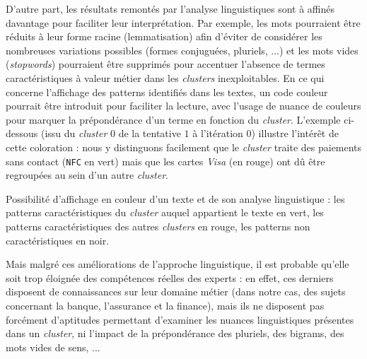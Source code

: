 			D'autre part, les résultats remontés par l'analyse linguistiques sont à affinés davantage pour faciliter leur interprétation.
			Par exemple, les mots pourraient être réduits à leur forme racine (lemmatisation) afin d'éviter de considérer les nombreuses variations possibles (formes conjuguées, pluriels, ...) et les mots vides (\textit{stopwords}) pourraient être supprimés pour accentuer l'absence de termes caractéristiques à valeur métier dans les \textit{clusters} inexploitables.
			En ce qui concerne l'affichage des patterns identifiés dans les textes, un code couleur pourrait être introduit pour faciliter la lecture, avec l'usage de nuance de couleurs pour marquer la prépondérance d'un terme en fonction du \textit{cluster}.
			L'exemple ci-dessous (issu du \textit{cluster} $0$ de la tentative $1$ à l'itération $0$) illustre l'intérêt de cette coloration : nous y distinguons facilement que le \textit{cluster} traite des paiements sans contact (\texttt{NFC} en vert) mais que les cartes \textit{Visa} (en rouge) ont dû être regroupées au sein d'un autre \textit{cluster}.

			\begin{leftBarExamples}
				Possibilité d'affichage en couleur d'un texte et de son analyse linguistique : les patterns caractéristiques du \textit{cluster} auquel appartient le texte en vert, les patterns caractéristiques des autres \textit{clusters} en rouge, les patterns non caractéristiques en noir.
				\begin{quote}
				\end{quote}
			\end{leftBarExamples}
			
			Mais malgré ces améliorations de l'approche linguistique, il est probable qu'elle soit trop éloignée des compétences réelles des experts : en effet, ces derniers disposent de connaissances sur leur domaine métier (dans notre cas, des sujets concernant la banque, l'assurance et la finance), mais ils ne disposent pas forcément d'aptitudes permettant d'examiner les nuances linguistiques présentes dans un \textit{cluster}, ni l'impact de la prépondérance des pluriels, des bigrams, des mots vides de sens, ...
		
